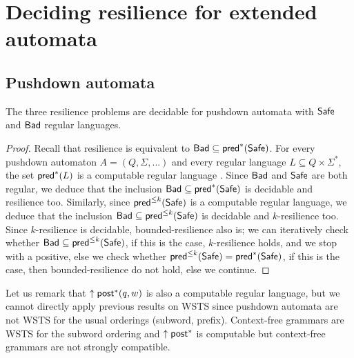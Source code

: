 \fi

\section{Deciding resilience for extended automata}


\subsection{Pushdown automata}


\begin{theorem}
The three {\sc resilience} problems are decidable for pushdown automata with $\textsf{Safe}$ and $\textsf{Bad}$ regular languages.
\end{theorem}

\begin{proof}
Recall that resilience is equivalent to  $\textsf{Bad} \subseteq \textsf{pred}^*(\textsf{Safe})$. For every pushdown automaton $A=(Q,\Sigma,...)$ and every regular language $L \subseteq Q \times \Sigma^*$, the set $\textsf{pred}^*(L)$ is a computable regular language \cite{DBLP:journals/ipl/BouajjaniEFMRWW00}. Since $\textsf{Bad}$ and $\textsf{Safe}$ are both regular, we deduce that
%
 the inclusion $\textsf{Bad} \subseteq \textsf{pred}^*(\textsf{Safe})$ is decidable and resilience too.
%
Similarly, since $ \textsf{pred}^{\leq k}(\textsf{Safe})$ is a computable regular language,
we deduce 
that the inclusion $\textsf{Bad} \subseteq \textsf{pred}^{\leq k}(\textsf{Safe})$ is decidable and $k$-resilience too.
Since $k$-resilience is decidable, bounded-resilience also is;
we can iteratively check whether $\textsf{Bad} \subseteq \textsf{pred}^{\leq k}(\textsf{Safe})$,
if this is the case, $k$-resilience holds, and we stop with a positive,
else we check whether $ \textsf{pred}^{\leq k}(\textsf{Safe}) =  \textsf{pred}^{*}(\textsf{Safe})$,
if this is the case, then bounded-resilience do not hold,
else we continue.
\end{proof}
%
Let us remark that $\uparrow \textsf{post}^*(q,w)$ is also a computable regular language, but we cannot directly apply previous results on WSTS since pushdown automata are not WSTS for the usual orderings (subword, prefix).
Context-free grammars are WSTS \cite{DBLP:journals/tcs/FinkelS01} for the subword ordering and $\uparrow \textsf{post}^*$ is computable but context-free grammars are not strongly compatible.



